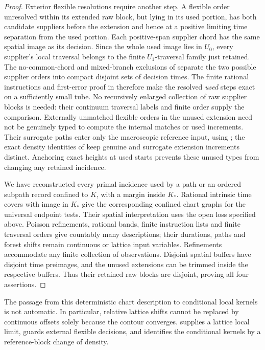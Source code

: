 \begin{proof}
Exterior flexible resolutions require another step. A flexible order unresolved within its extended raw block, but lying in its used portion, has both candidate suppliers before the extension and hence at a positive limiting time separation from the used portion. Each positive-span supplier chord has the same spatial image as its decision. Since the whole used image lies in \(U_0\), every supplier's local traversal belongs to the finite \(U_1\)-traversal family just retained. The no-common-chord and mixed-branch exclusions of  separate the two possible supplier orders into compact disjoint sets of decision times. The finite rational instructions and first-error proof in  therefore make the resolved \emph{used} steps exact on a sufficiently small tube. No recursively enlarged collection of raw supplier blocks is needed: their continuum traversal labels and finite order supply the comparison. Externally unmatched flexible orders in the unused extension need not be genuinely typed to compute the internal matches or used increments. Their surrogate paths enter only the macroscopic reference input, using ; the exact density identities of  keep genuine and surrogate extension increments distinct. Anchoring exact heights at used starts prevents these unused types from changing any retained incidence.

We have reconstructed every primal incidence used by a path or an ordered subpath record confined to \(K\), with a margin inside \(K_*\). Rational intrinsic time covers with image in \(K_*\) give the corresponding confined chart graphs for the universal endpoint tests. Their spatial interpretation uses the open loss specified above. Poisson refinements, rational bands, finite instruction lists and finite traversal orders give countably many descriptions; their durations, paths and forest shifts remain continuous or lattice input variables. Refinements accommodate any finite collection of observations. Disjoint spatial buffers have disjoint time preimages, and the unused extensions can be trimmed inside the respective buffers. Thus their retained raw blocks are disjoint, proving all four assertions.
\end{proof}

The passage from this deterministic chart description to conditional local kernels is not automatic. In particular, relative lattice shifts cannot be replaced by continuous offsets solely because the contour converges.  supplies a lattice local limit, guards external flexible decisions, and identifies the conditional kernels by a reference-block change of density.
